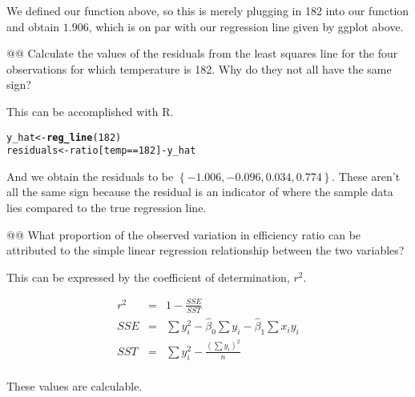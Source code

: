\documentclass[10pt]{article}\usepackage[]{graphicx}\usepackage[]{xcolor}
\makeatletter
\newcommand{\hlnum}[1]{\textcolor[rgb]{0.686,0.059,0.569}{#1} }%
\newcommand{\hlopt}[1]{\textcolor[rgb]{0,0,0}{#1} }%
\newcommand{\hlstd}[1]{\textcolor[rgb]{0.345,0.345,0.345}{#1} }%
\newcommand{\hlkwb}[1]{\textcolor[rgb]{0.69,0.353,0.396}{#1} }%
\newcommand{\hlkwd}[1]{\textcolor[rgb]{0.737,0.353,0.396}{\textbf{#1} } }%
\newenvironment{kframe}{%
 \def\at@end@of@kframe{}%
 \ifinner\ifhmode%
  \def\at@end@of@kframe{\end{minipage} }%
  \begin{minipage}{\columnwidth}%
 \fi\fi%
 \def\FrameCommand##1{\hskip\@totalleftmargin \hskip-\fboxsep
 \colorbox{shadecolor}{##1}\hskip-\fboxsep
     \hskip-\linewidth \hskip-\@totalleftmargin \hskip\columnwidth}%
 \MakeFramed {\advance\hsize-\width
   \@totalleftmargin\z@ \linewidth\hsize
   \@setminipage} }%
 {\par\unskip\endMakeFramed%
 \at@end@of@kframe}
\newenvironment{knitrout}{}{} %
\makeatother
\begin{document}
\begin{easylist}[enumerate]
    We defined our function above, so this is merely plugging in 182 into our function and obtain
    $1.906$, which is on par with our regression line given by ggplot above.

    @@ Calculate the values of the residuals from the least squares line for the four observations for which temperature
    is 182. Why do they not all have the same sign?\newline

    This can be accomplished with R.

\begin{knitrout}
\color{fgcolor}\begin{kframe}
\begin{alltt}
         \hlstd{y_hat} \hlkwb{<-} \hlkwd{reg_line}\hlstd{(}\hlnum{182}\hlstd{)}
         \hlstd{residuals} \hlkwb{<-} \hlstd{ratio[temp} \hlopt{==} \hlnum{182}\hlstd{]} \hlopt{-} \hlstd{y_hat}
\end{alltt}
\end{kframe}
\end{knitrout}


    And we obtain the residuals to be $\left\{-1.006, -0.096, 0.034, 0.774\right\}$. These aren't all the same sign because the
    residual is an indicator of where the sample data lies compared to the true regression line.

    @@ What proportion of the observed variation in efficiency ratio can be attributed to the simple linear regression
    relationship between the two variables?\newline

    This can be expressed by the coefficient of determination, $r^2$.

    \begin{equation}
        \begin{aligned}
            r^2 &=& 1 - \frac{SSE}{SST}\\
            SSE &=& \sum y_i^2 - \hat{\beta}_0 \sum y_i - \hat{\beta}_1 \sum x_i y_i\\
            SST &=& \sum y_i^2 - \frac{ {\left( \sum y_i \right)}^2}{n}\\
        \end{aligned}
    \end{equation}

    These values are calculable.


\end{easylist}
\end{document}
